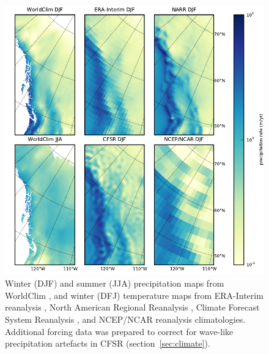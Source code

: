 \documentclass[tc, ms]{copernicus}
\begin{document}
\begin{figure}[t]
	\vspace*{2mm}
	\begin{center}
		\includegraphics{cordillera-climate-prec}
	\end{center}
	\caption{Winter (DJF) and summer (JJA) precipitation maps from WorldClim \citep{data:worldclim}, and winter (DFJ) temperature maps from ERA-Interim reanalysis \citep{data:erai}, North American Regional Reanalysis \citep[NARR;][]{data:narr}, Climate Forecast System Reanalysis \citep[CFSR;][]{data:cfsr}, and NCEP/NCAR reanalysis \citep{data:ncar} climatologies. Additional forcing data was prepared to correct for wave-like precipitation artefacts in CFSR (section~\ref{sec:climate}).}
	\label{fig:prec}
\end{figure}
\end{document}
